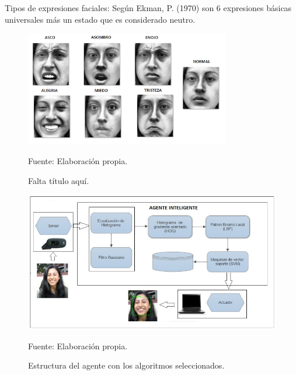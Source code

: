\begin{itemize}
Tipos de expresiones faciales: \vskip 0.1cm
Según Ekman, P. (1970) son 6 expresiones básicas universales más un estado que es considerado neutro.

\begin{figure}[ht]
\begin{center}
\includegraphics[width=0.8\textwidth]{Imagen30}
\end{center}
\begin{center}
\vskip -0.5cm
\caption{\small{Falta título aquí.}}
{\small{Fuente: Elaboración propia.}}
\end{center}
\end{figure}

\begin{figure}[ht]
\begin{center}
\includegraphics[width=1\textwidth]{Imagen31}
\end{center}
\begin{center}
\vskip -0.5cm
\caption{\small{Estructura del agente con los algoritmos seleccionados.}}
{\small{Fuente: Elaboración propia.}}
\end{center}
\end{figure}

\end{itemize}

